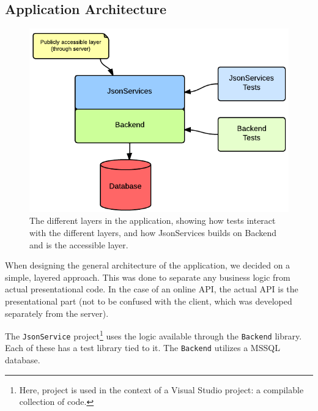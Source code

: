 \subsection{Application Architecture}

\begin{figure}[hbt]
	\centering
	\includegraphics[scale=0.5]{./p1design/layers.png}
	\caption{The different layers in the application, showing how tests interact with
        the different layers, and how JsonServices builds on Backend and is the accessible
        layer.}
	\label{fig:layers}
\end{figure}

When designing the general architecture of the application, we decided on a simple, layered approach.
This was done to separate any business logic from actual presentational code. In the case of an online
API, the actual API is the presentational part (not to be confused with the client, which was developed
separately from the server).

The \verb+JsonService+ project\footnote{Here, project is used in the context of
a Visual Studio project: a compilable collection of code.} uses the logic
available through the \verb+Backend+ library. Each of these has a test library
tied to it. The \verb+Backend+ utilizes a MSSQL database.
